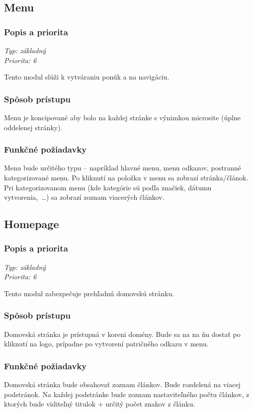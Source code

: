 \documentclass[a4paper,titlepage,11pt]{article}
\begin{document}
\subsection{Menu}
\subsubsection{Popis a priorita}
\begin{flushleft}
 \emph{Typ: základný}\\
 \emph{Priorita: 6}\\
\end{flushleft}
Tento modul slúži k vytváraniu ponúk a na navigáciu.
\subsubsection{Spôsob prístupu}
Menu je koncipované aby bolo na každej stránke s výnimkou microsite (úplne oddelenej stránky). 
\subsubsection{Funkčné požiadavky}
Menu bude určitého typu -- napríklad hlavné menu, menu odkazov, postranné kategorizované menu. 
Po kliknutí na položku v menu sa zobrazí stránka\slash článok. 
Pri kategorizovanom menu (kde kategórie sú podľa značiek, dátumu vytvorenia,~\ldots) sa zobrazí zoznam viacerých článkov. 

\subsection{Homepage}
\subsubsection{Popis a priorita}
\begin{flushleft}
 \emph{Typ: základný}\\
 \emph{Priorita: 6}\\
\end{flushleft}
Tento modul zabezpečuje prehľadnú domovskú stránku. 
\subsubsection{Spôsob prístupu}
Domovská stránka je prístupná v koreni domény. Bude sa na na ňu dostať po kliknutí na logo, prípadne po vytvorení patričného odkazu v menu.
\subsubsection{Funkčné požiadavky}
Domovská stránka bude obsahovať zoznam článkov. Bude rozdelená na viacej podstránok. 
Na každej podstránke bude zoznam nastaviteľného počtu článkov, z ktorých bude viditeľný titulok $+$ určitý počet znakov z článku.
\end{document}
